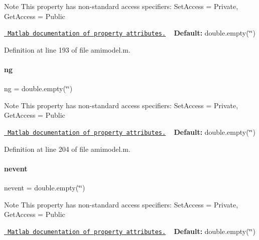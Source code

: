 \begin{DoxyNote}{Note}
This property has non-\/standard access specifiers\+: {\ttfamily Set\+Access = Private, Get\+Access = Public} 

\href{http://www.mathworks.com/help/matlab/matlab_oop/property-attributes.html}{\texttt{ Matlab documentation of property attributes.}} ~\newline
{\bfseries{Default\+:}} double.\+empty(\char`\"{}\char`\"{}) 
\end{DoxyNote}


Definition at line 193 of file amimodel.\+m.

\mbox{\label{classamimodel_a436ae5c63852a2df5372ebffaa35161c}} 
\paragraph{\texorpdfstring{ng}{ng}}
{\footnotesize\ttfamily ng = double.\+empty(\char`\"{}\char`\"{})}

\begin{DoxyNote}{Note}
This property has non-\/standard access specifiers\+: {\ttfamily Set\+Access = Private, Get\+Access = Public} 

\href{http://www.mathworks.com/help/matlab/matlab_oop/property-attributes.html}{\texttt{ Matlab documentation of property attributes.}} ~\newline
{\bfseries{Default\+:}} double.\+empty(\char`\"{}\char`\"{}) 
\end{DoxyNote}


Definition at line 204 of file amimodel.\+m.

\mbox{\label{classamimodel_aab5c7f06273122b68624eb3bca6a9b6e}} 
\paragraph{\texorpdfstring{nevent}{nevent}}
{\footnotesize\ttfamily nevent = double.\+empty(\char`\"{}\char`\"{})}

\begin{DoxyNote}{Note}
This property has non-\/standard access specifiers\+: {\ttfamily Set\+Access = Private, Get\+Access = Public} 

\href{http://www.mathworks.com/help/matlab/matlab_oop/property-attributes.html}{\texttt{ Matlab documentation of property attributes.}} ~\newline
{\bfseries{Default\+:}} double.\+empty(\char`\"{}\char`\"{}) 
\end{DoxyNote}


